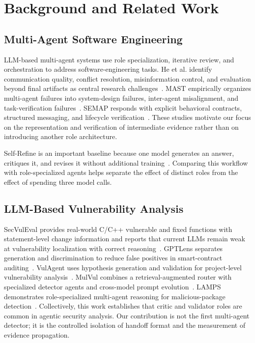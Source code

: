 \section{Background and Related Work}

\subsection{Multi-Agent Software Engineering}

LLM-based multi-agent systems use role specialization, iterative review, and orchestration to address software-engineering tasks. He et al. identify communication quality, conflict resolution, misinformation control, and evaluation beyond final artifacts as central research challenges~\cite{he2025road}. MAST empirically organizes multi-agent failures into system-design failures, inter-agent misalignment, and task-verification failures~\cite{cemri2025mast}. SEMAP responds with explicit behavioral contracts, structured messaging, and lifecycle verification~\cite{mao2025semap}. These studies motivate our focus on the representation and verification of intermediate evidence rather than on introducing another role architecture.

Self-Refine is an important baseline because one model generates an answer, critiques it, and revises it without additional training~\cite{madaan2023selfrefine}. Comparing this workflow with role-specialized agents helps separate the effect of distinct roles from the effect of spending three model calls.

\subsection{LLM-Based Vulnerability Analysis}

SecVulEval provides real-world C/C++ vulnerable and fixed functions with statement-level change information and reports that current LLMs remain weak at vulnerability localization with correct reasoning~\cite{ahmed2025secvuleval}. GPTLens separates generation and discrimination to reduce false positives in smart-contract auditing~\cite{hu2023gptlens}. VulAgent uses hypothesis generation and validation for project-level vulnerability analysis~\cite{wang2026vulagent}. MulVul combines a retrieval-augmented router with specialized detector agents and cross-model prompt evolution~\cite{wu2026mulvul}. LAMPS demonstrates role-specialized multi-agent reasoning for malicious-package detection~\cite{zeshan2026lamps}. Collectively, this work establishes that critic and validator roles are common in agentic security analysis. Our contribution is not the first multi-agent detector; it is the controlled isolation of handoff format and the measurement of evidence propagation.

